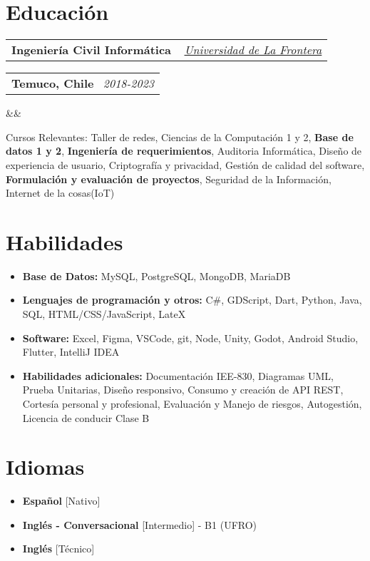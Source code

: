 \documentclass[11pt,a4paper,sans]{moderncv}
\makeatletter
\newcommand*{\customcventry}[7][.13em]{
    \begin{tabular}{@{}l}
    {\bfseries #4} \
    {\itshape #3}
    \end{tabular}
    \hfill
    \begin{tabular}{l@{}}
    {\bfseries #5} \
    {\itshape #2}
    \end{tabular}
    \ifx&#7&%
    \else{\
    \begin{minipage}{\maincolumnwidth}%
    \small#7%
    \end{minipage}}\fi%
    \par\addvspace{#1}
}
\makeatother
\begin{document}
\section{Educación}
\customcventry
    {2018-2023}
    { \href{https://1drv.ms/b/c/13c8ae619d64655e/EV5lZJ1hrsgggBOHLAAAAAABHh9OZUbWLd2nx7PTa_OSsg?e=Fedmge}
        {\underline{Universidad de La Frontera}} }
        {Ingeniería Civil Informática}
        {Temuco, Chile}
    {}{}
    {Cursos Relevantes: 
        Taller de redes, 
        Ciencias de la Computación 1 y 2, 
        \textbf{Base de datos 1 y 2}, 
        \textbf{Ingeniería de requerimientos},
        Auditoria Informática, 
        Diseño de experiencia de usuario, 
        Criptografía y privacidad, 
        Gestión de calidad del software, 
        \textbf{Formulación y evaluación de proyectos},
        Seguridad de la Información,
        Internet de la cosas(IoT)
}
    

\section{Habilidades}
\begin{itemize}[label=\textbullet]
    \item {\textbf{Base de Datos:} 
        MySQL, 
        PostgreSQL, 
        MongoDB, 
        MariaDB
    }
    \item {\textbf{Lenguajes de programación y otros:} 
        C\#, 
        GDScript, 
        Dart, 
        Python, 
        Java,
        SQL,
        HTML/CSS/JavaScript,
        LateX
    }
    \item {\textbf{Software:}  
        Excel,  
        Figma, 
        VSCode, 
        git,
        Node,
        Unity,
        Godot,
        Android Studio,
        Flutter,
        IntelliJ IDEA
    }
    \item {\textbf{Habilidades adicionales:} 
        Documentación IEE-830,
        Diagramas UML,
        Prueba Unitarias,
        Diseño responsivo,
        Consumo y creación de API REST,
        Cortesía personal y profesional, 
        Evaluación y Manejo de riesgos,  
        Autogestión, 
        Licencia de conducir Clase B
    }
\end{itemize}

\section{Idiomas}
\begin{multicols}{2}
    \begin{itemize}[label=\textbullet]
    \item \textbf{Español} [Nativo]
    \item \textbf{Inglés - Conversacional} [Intermedio] - B1 (UFRO)
    \item \textbf{Inglés} [Técnico]
    \end{itemize}
\end{multicols}
\end{document}
